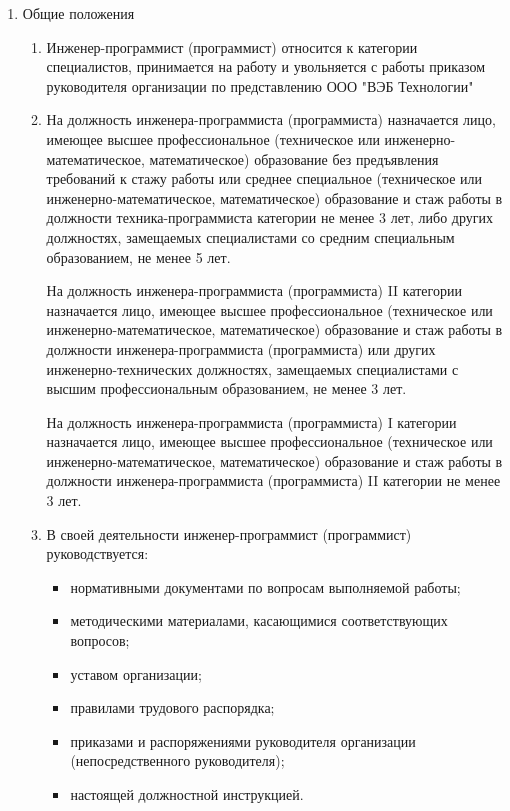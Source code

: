 \documentclass[12pt,a4paper,draft]{report}
\begin{document}
\begin{enumerate}
    \item Общие положения
    \begin{enumerate}
        \item Инженер-программист (программист) относится к категории специалистов, принимается на работу и увольняется с работы приказом руководителя организации по представлению ООО "ВЭБ Технологии"
        
        \item На должность инженера-программиста (программиста) назначается лицо, имеющее высшее профессиональное (техническое или инженерно-математическое, математическое) образование без предъявления требований к стажу работы или среднее специальное (техническое или инженерно-математическое, математическое) образование и стаж работы в должности техника-программиста категории не менее 3 лет, либо других должностях, замещаемых специалистами со средним специальным образованием, не менее 5 лет.

        На должность инженера-программиста (программиста) II категории назначается лицо, имеющее высшее профессиональное (техническое или инженерно-математическое, математическое) образование и стаж работы в должности инженера-программиста (программиста) или других инженерно-технических должностях, замещаемых специалистами с высшим профессиональным образованием, не менее 3 лет.
    
        На должность инженера-программиста (программиста) I категории назначается лицо, имеющее высшее профессиональное (техническое или инженерно-математическое, математическое) образование и стаж работы в должности инженера-программиста (программиста) II категории не менее 3 лет.

        \item В своей деятельности инженер-программист (программист) руководствуется:
        \begin{itemize}
            \item нормативными документами по вопросам выполняемой работы;
            \item методическими материалами, касающимися соответствующих вопросов;
            \item уставом организации;
            \item правилами трудового распорядка;
            \item приказами и распоряжениями руководителя организации (непосредственного руководителя);
            \item настоящей должностной инструкцией.
        \end{itemize}
        

\end{enumerate}
\end{enumerate}
\end{document}

